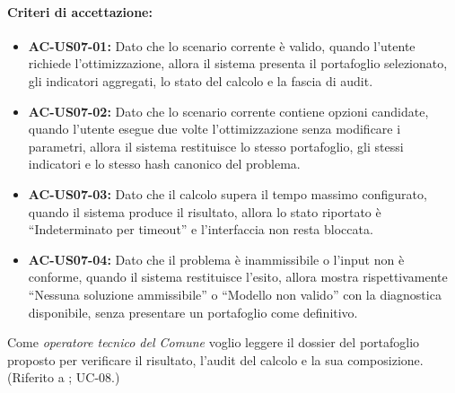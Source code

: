 \paragraph{Criteri di accettazione:}
\begin{itemize}[leftmargin=1.4em]
    \item \textbf{AC-US07-01:} Dato che lo scenario corrente è valido, quando l'utente richiede l'ottimizzazione, allora il sistema presenta il portafoglio selezionato, gli indicatori aggregati, lo stato del calcolo e la fascia di audit.
    \item \textbf{AC-US07-02:} Dato che lo scenario corrente contiene opzioni candidate, quando l'utente esegue due volte l'ottimizzazione senza modificare i parametri, allora il sistema restituisce lo stesso portafoglio, gli stessi indicatori e lo stesso hash canonico del problema.
    \item \textbf{AC-US07-03:} Dato che il calcolo supera il tempo massimo configurato, quando il sistema produce il risultato, allora lo stato riportato è ``Indeterminato per timeout'' e l'interfaccia non resta bloccata.
    \item \textbf{AC-US07-04:} Dato che il problema è inammissibile o l'input non è conforme, quando il sistema restituisce l'esito, allora mostra rispettivamente ``Nessuna soluzione ammissibile'' o ``Modello non valido'' con la diagnostica disponibile, senza presentare un portafoglio come definitivo.
\end{itemize}

 \label{us:risultato}
Come \textit{operatore tecnico del Comune} voglio leggere il dossier del portafoglio proposto per verificare il risultato, l'audit del calcolo e la sua composizione. \\ (Riferito a ; UC-08.)

